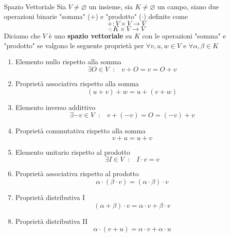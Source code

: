 \documentclass{rapport}
\begin{document}
\begin{definizione}{Spazio Vettoriale}{}
  Sia $V \ne \varnothing$ un insieme, sia $K\ne \varnothing$ un campo, siano due operazioni binarie "somma" ($+$) e "prodotto" ($\cdot$) definite come
  \vspace{-0.3cm}\[
  + : V \times V \to V
  \]
  \[
  \cdot : K \times V \to V 
  \]
  Diciamo che $V$ è uno \textbf{spazio vettoriale} su  $K$ con le  operazioni  "somma" e "prodotto" se valgono le seguente proprietà per $\forall v, u, w \in V$ e $\forall \alpha, \beta \in K$
  \begin{enumerate}[label=(\roman*)]
    \item Elemento nullo rispetto alla somma
    \[
    \exists O \in V \;\;: \;\;\; v+O = v = O+v
    \]\vspace{-0.9cm}\item Proprietà associativa rispetto alla somma
    \[
    (u+v) +w = u+(v+w)
    \]\vspace{-0.9cm}
    \item Elemento inverso addittivo
    \[
    \exists -v \in V \;\;: \;\;\; v+(-v) = O = (-v)+v
    \]\vspace{-0.9cm}
    \item Proprietà commutativa rispetto alla somma
    \[
    v+u = u+v
    \]\vspace{-0.9cm}
    \item Elemento unitario rispetto al prodotto 
    \[
    \exists I \in V \;\;: \;\;\; I\cdot v = v 
    \]\vspace{-0.9cm}
    \item Proprietà associativa rispetto al prodotto
    \[
    \alpha\cdot (\beta \cdot v) = (\alpha\cdot \beta) \cdot v 
    \]\vspace{-0.9cm}
    \item Proprietà distributiva I
    \[
    (\alpha+ \beta )\cdot v = \alpha\cdot v + \beta \cdot v 
    \] \vspace{-0.9cm}
    \item Proprietà distributiva II
    \[
    \alpha\cdot(v+ u)= \alpha\cdot v + \alpha\cdot u
    \]
  \end{enumerate}
\end{definizione}
\end{document}
